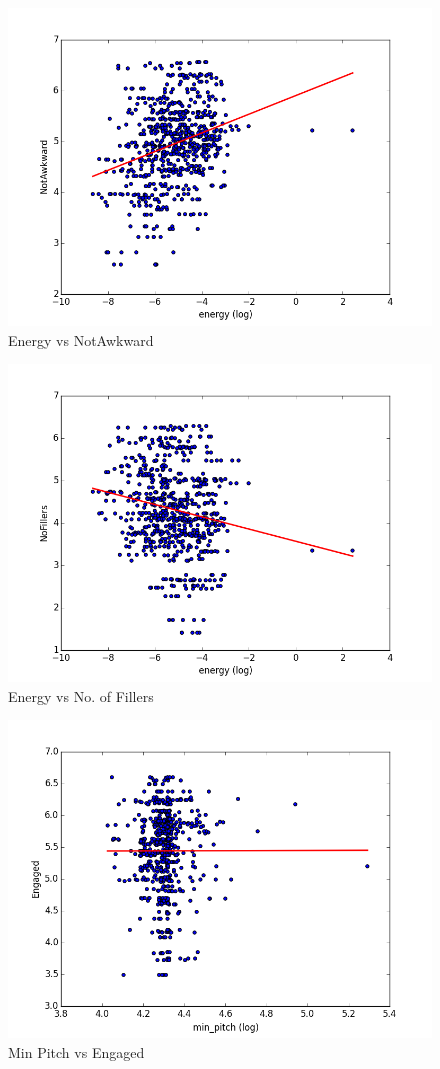 \documentclass[11pt]{article}
\begin{document}
\begin{figure}[H]
\begin{center}
\includegraphics[width=0.6\columnwidth]{figures/NotAwkward and energy.png}
\caption{Energy vs NotAwkward}
\label{fig:prosodic_analysis3}
\end{center}
\end{figure}

\begin{figure}[H]
\begin{center}
\includegraphics[width=0.6\columnwidth]{figures/NoFillers and energy.png}
\caption{Energy vs No. of Fillers}
\label{fig:prosodic_analysis5}
\end{center}
\end{figure}


\begin{figure}[H]
\begin{center}
\includegraphics[width=0.6\columnwidth]{figures/Engaged and min_pitch.png}
\caption{Min Pitch vs Engaged}
\label{fig:prosodic_analysis4}
\end{center}
\end{figure}
\end{document}
